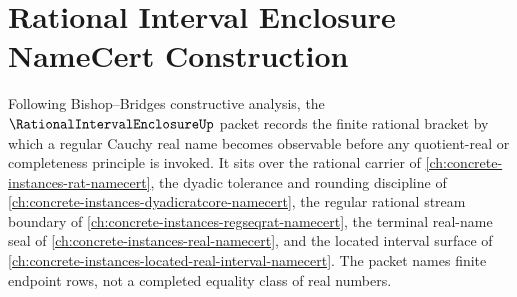 \chapter{Rational Interval Enclosure NameCert Construction}
\label{ch:concrete-instances-rational-interval-enclosure-namecert}

Following Bishop--Bridges constructive analysis, the $\RationalIntervalEnclosureUp$ packet records the finite rational bracket by which a regular Cauchy real name becomes observable before any quotient-real or completeness principle is invoked. It sits over the rational carrier of \autoref{ch:concrete-instances-rat-namecert}, the dyadic tolerance and rounding discipline of \autoref{ch:concrete-instances-dyadicratcore-namecert}, the regular rational stream boundary of \autoref{ch:concrete-instances-regseqrat-namecert}, the terminal real-name seal of \autoref{ch:concrete-instances-real-namecert}, and the located interval surface of \autoref{ch:concrete-instances-located-real-interval-namecert}. The packet names finite endpoint rows, not a completed equality class of real numbers.

